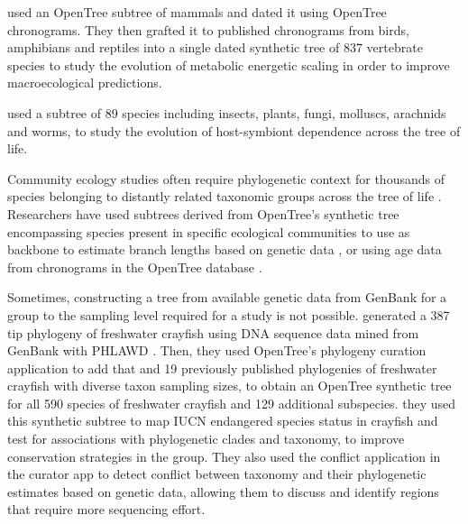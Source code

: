 \documentclass[oupdraft]{sysbio_sse}
\begin{document}
\citep{uyeda2017evolution} used an OpenTree subtree of mammals and dated it using OpenTree
chronograms. They then grafted it to published chronograms from birds, amphibians
and reptiles into a single dated synthetic tree of 837 vertebrate species to study
the evolution of metabolic energetic scaling in order to improve macroecological predictions.

\citep{fisher2017evolution} used a subtree of 89 species including insects, plants,
fungi, molluscs, arachnids and worms, to study the evolution of host-symbiont
dependence across the tree of life.


Community ecology studies often require phylogenetic context for thousands of
species belonging to distantly related taxonomic groups across the tree of life \citep{}.
Researchers have used subtrees derived from OpenTree's synthetic tree encompassing species present
in specific ecological communities to use as backbone to estimate branch lengths
based on genetic data \citep{}, or using age data from chronograms in the OpenTree database \citep{}.

Sometimes, constructing a tree from available genetic data from GenBank for a group
to the sampling level required for a study is not possible.
\citep{owen2015synthetic} generated a 387 tip phylogeny of freshwater crayfish using DNA sequence
data mined from GenBank with PHLAWD \citep{smith2009mega}. Then, they used OpenTree's phylogeny
curation application to add that and 19 previously published phylogenies of freshwater crayfish
with diverse taxon sampling sizes, to obtain an OpenTree synthetic tree for all 590 species
of freshwater crayfish and 129 additional subspecies.
they used this synthetic subtree to map IUCN endangered species status in crayfish
and test for associations with phylogenetic clades and taxonomy, to improve conservation
strategies in the group.
They also used the conflict application in the curator app to detect conflict between
taxonomy and their phylogenetic estimates based on genetic data, allowing them to
discuss and identify regions that require more sequencing effort.
\end{document}
